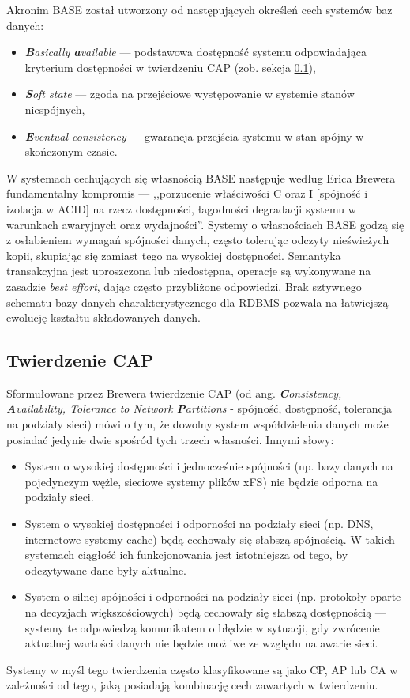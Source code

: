Akronim BASE został utworzony od następujących określeń cech systemów baz danych:
\begin{itemize}
    \item \textit{\textbf{B}asically \textbf{a}vailable} --- podstawowa dostępność systemu odpowiadająca kryterium dostępności w twierdzeniu CAP (zob. sekcja \ref{captheorem}),
    \item \textit{\textbf{S}oft state} --- zgoda na przejściowe występowanie w systemie stanów niespójnych,
    \item \textit{\textbf{E}ventual consistency} --- gwarancja przejścia systemu w stan spójny w skończonym czasie.
\end{itemize}
W systemach cechujących się własnością BASE następuje według Erica Brewera fundamentalny kompromis --- ,,porzucenie właściwości C oraz I [spójność i izolacja w ACID] na rzecz dostępności, łagodności degradacji systemu w warunkach awaryjnych oraz wydajności''. Systemy o własnościach BASE godzą się z osłabieniem wymagań spójności danych, często tolerując odczyty nieświeżych kopii, skupiając się zamiast tego na wysokiej dostępności. Semantyka transakcyjna jest uproszczona lub niedostępna, operacje są wykonywane na zasadzie \textit{best effort}, dając często przybliżone odpowiedzi. Brak sztywnego schematu bazy danych charakterystycznego dla RDBMS pozwala na łatwiejszą ewolucję kształtu składowanych danych.


\subsection{Twierdzenie CAP} \label{captheorem}

Sformułowane przez Brewera twierdzenie CAP (od ang. \textit{\textbf{C}onsistency, \textbf{A}vailability, Tolerance to Network \textbf{P}artitions} - spójność, dostępność, tolerancja na podziały sieci) mówi o tym, że dowolny system współdzielenia danych może posiadać jedynie dwie spośród tych trzech własności. Innymi słowy:
\begin{itemize}
    \item System o wysokiej dostępności i jednocześnie spójności (np. bazy danych na pojedynczym wężle, sieciowe systemy plików xFS) nie będzie odporna na podziały sieci.
    \item System o wysokiej dostępności i odporności na podziały sieci (np. DNS, internetowe systemy cache) będą cechowały się słabszą spójnością. W takich systemach ciągłość ich funkcjonowania jest istotniejsza od tego, by odczytywane dane były aktualne.
    \item System o silnej spójności i odporności na podziały sieci (np. protokoły oparte na decyzjach większościowych) będą cechowały się słabszą dostępnością --- systemy te odpowiedzą komunikatem o błędzie w sytuacji, gdy zwrócenie aktualnej wartości danych nie będzie możliwe ze względu na awarie sieci.
\end{itemize}
Systemy w myśl tego twierdzenia często klasyfikowane są jako CP, AP lub CA w zależności od tego, jaką posiadają kombinację cech zawartych w twierdzeniu.

